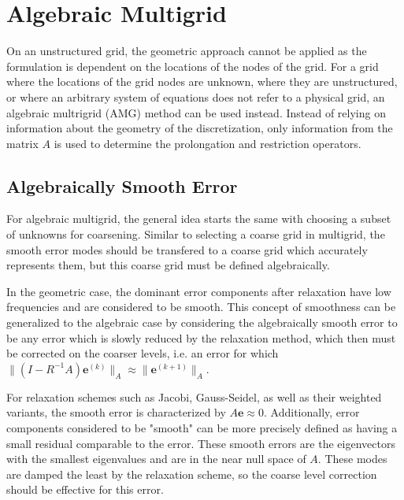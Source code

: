 


\section{Algebraic Multigrid}


On an unstructured grid, the geometric approach cannot be applied as the formulation is dependent on the locations of the nodes of the grid. For a grid where the locations of the grid nodes are unknown, where they are unstructured, or where an arbitrary system of equations does not refer to a physical grid, an algebraic multrigrid (AMG) method can be used instead. Instead of relying on information about the geometry of the discretization, only information from the matrix $A$ is used to determine the prolongation and restriction operators.


\subsection{Algebraically Smooth Error}

For algebraic multigrid, the general idea starts the same with choosing a subset of unknowns for coarsening. Similar to selecting a coarse grid in multigrid, the smooth error modes should be transfered to a coarse grid which accurately represents them, but this coarse grid must be defined algebraically. %

In the geometric case, the dominant error components after relaxation have low frequencies and are considered to be smooth. This concept of smoothness can be generalized to the algebraic case by considering the algebraically smooth error to be any error which is slowly reduced by the relaxation method, which then must be corrected on the coarser levels, i.e. an error for which $ \|(I - R^{-1}A)\mathbf{e}^{(k)}\|_A \approx \| \mathbf{e}^{(k+1)}\|_A $.

For relaxation schemes such as Jacobi, Gauss-Seidel, as well as their weighted variants, the smooth error is characterized by $ A\mathbf{e} \approx 0 $. Additionally, error components considered to be "smooth" can be more precisely defined as having a small residual comparable to the error. These smooth errors are the eigenvectors with the smallest eigenvalues and are in the near null space of $A$. These modes are damped the least by the relaxation scheme, so the coarse level correction should be effective for this error.

